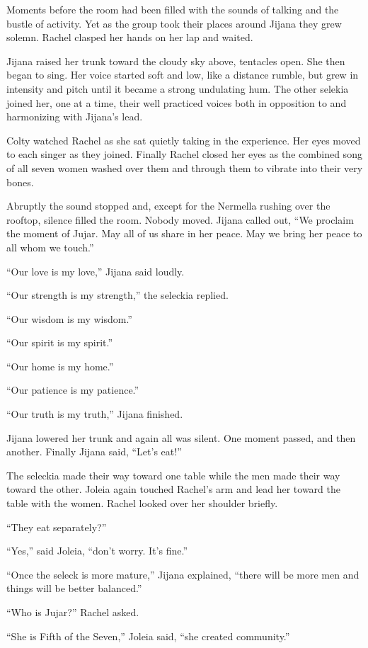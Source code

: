 Moments before the room had been filled with the sounds of talking and the bustle of activity.
Yet as the group took their places around Jijana they grew solemn. Rachel clasped her hands on
her lap and waited.

Jijana raised her trunk toward the cloudy sky above, tentacles open. She then began to sing. Her
voice started soft and low, like a distance rumble, but grew in intensity and pitch until it
became a strong undulating hum. The other selekia joined her, one at a time, their well
practiced voices both in opposition to and harmonizing with Jijana's lead.

Colty watched Rachel as she sat quietly taking in the experience. Her eyes moved to each singer
as they joined. Finally Rachel closed her eyes as the combined song of all seven women washed
over them and through them to vibrate into their very bones.

Abruptly the sound stopped and, except for the Nermella rushing over the rooftop, silence filled
the room. Nobody moved. Jijana called out, ``We proclaim the moment of Jujar. May all of us
share in her peace. May we bring her peace to all whom we touch.''

``Our love is my love,'' Jijana said loudly.

``Our strength is my strength,'' the seleckia replied.

``Our wisdom is my wisdom.''

``Our spirit is my spirit.''

``Our home is my home.''

``Our patience is my patience.''

``Our truth is my truth,'' Jijana finished.

Jijana lowered her trunk and again all was silent. One moment passed, and then another. Finally
Jijana said, ``Let's eat!''

The seleckia made their way toward one table while the men made their way toward the other.
Joleia again touched Rachel's arm and lead her toward the table with the women. Rachel looked
over her shoulder briefly.

``They eat separately?''

``Yes,'' said Joleia, ``don't worry. It's fine.''

``Once the seleck is more mature,'' Jijana explained, ``there will be more men and things will
be better balanced.''

``Who is Jujar?'' Rachel asked.

``She is Fifth of the Seven,'' Joleia said, ``she created community.''


